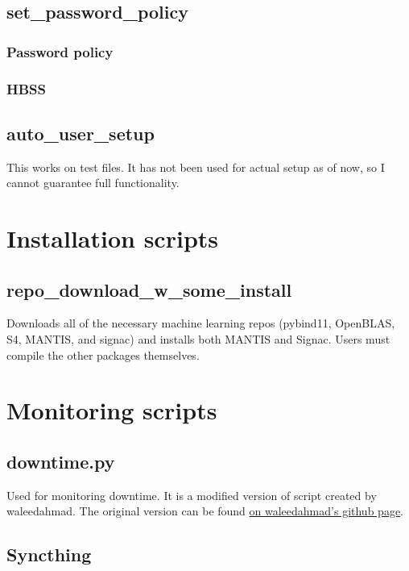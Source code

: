 \documentclass[10pt,letterpaper]{report}
\begin{document}
\section{set\_password\_policy} 		\label{sec:passwd}
\subsection{Password policy} 		\label{subsec:passwdpolicy}
	
\subsection{HBSS}			\label{subsec:HBSS}
	

\section{auto\_user\_setup}		\label{sec:users}
This works on test files. It has not been used for actual setup as of now, so I cannot guarantee full functionality.

\chapter{Installation scripts}		\label{ch:install}

\section{repo\_download\_w\_some\_install}	\label{sec:repoDL}
Downloads all of the necessary machine learning repos (pybind11, OpenBLAS, S4, MANTIS, and signac) and installs both MANTIS and Signac. Users must compile the other packages themselves.

	

\chapter{Monitoring scripts}		\label{ch:monitor}

\section{downtime.py}			\label{sec:downtime}
Used for monitoring downtime. It is a modified version of script created by waleedahmad. The original version can be found \href{https://gist.github.com/waleedahmad/326ec53f76646dccec299910a7fb4f2b}{on waleedahmad's github page}.

\section{Syncthing}				\label{sec:syncthing}
	



\end{document}
